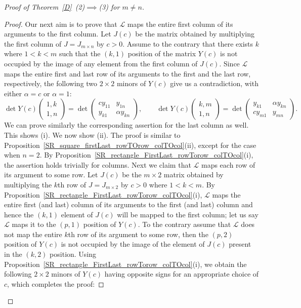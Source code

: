 \documentclass[11pt,reqno]{amsart}
\theoremstyle{plain}
\theoremstyle{definition}
\numberwithin{equation}{section}
\begin{document}
\begin{proof}[Proof of Theorem~\ref{D}~(2)$\implies$(3) for $m\neq n$]
\begin{proof}
		Our next aim is to prove that $\mathcal{L}$ maps the entire first column of its arguments to the first column. Let $J(c)$ be the matrix obtained by multiplying the first column of $J=J_{m\times n}$ by $c>0$. Assume to the contrary that there exists $k$ where $1<k<m$ such that the $(k,1)$ position of the matrix $Y(c)$ is not occupied by the image of any element from the first column of $J(c)$. Since $\mathcal{L}$ maps the entire first and last row of its arguments to the first and the last row, respectively, the following two $2 \times 2$ minors of $Y(c)$ give us a contradiction, with either $\alpha = c$ or $\alpha = 1$:
		\[ \det Y(c)\begin{pmatrix}1,k\\1,n\end{pmatrix}=
		\det\begin{pmatrix}
			cy_{11} & y_{1n} \\
			y_{k1} & \alpha y_{kn}
		\end{pmatrix}, \qquad
		\det Y(c)\begin{pmatrix}k,m\\1,n\end{pmatrix}
		= \det\begin{pmatrix}
			y_{k1} & \alpha y_{kn} \\
			cy_{m1} & y_{mn}
		\end{pmatrix}.\]
		We can prove similarly the corresponding assertion for the last column as well. This shows (i). We now show (ii). The proof is similar to Proposition~\ref{SR_square_firstLast_rowTOrow_colTOcol}(ii), except for the case when $n=2$. By Proposition~\ref{SR_rectangle_FirstLast_rowTorow_colTOcol}(i), the assertion holds trivially for columns. Next we claim that $\mathcal{L}$ maps each row of its argument to some row. Let $J(c)$ be the $m\times2$ matrix obtained by multiplying the $k$th row of $J=J_{m\times 2}$ by $c>0$ where $1<k<m$. By Proposition~\ref{SR_rectangle_FirstLast_rowTorow_colTOcol}(i), $\mathcal{L}$ maps the entire first (and last) column of its arguments to the first (and last) column and hence the $(k,1)$ element of $J(c)$ will be mapped to the first column; let us say $\mathcal{L}$ maps it to the $(p,1)$ position of $Y(c)$. To the contrary assume that $\mathcal{L}$ does not map the entire $k$th row of its argument to some row, then the $(p,2)$ position of $Y(c)$ is not occupied by the image of the element of $J(c)$ present in the $(k,2)$ position. Using Proposition~\ref{SR_rectangle_FirstLast_rowTorow_colTOcol}(i), we obtain the following $2 \times 2$ minors of $Y(c)$ having opposite signs for an appropriate choice of $c$, which completes the proof:

\end{proof}
\end{proof}
\end{document}
